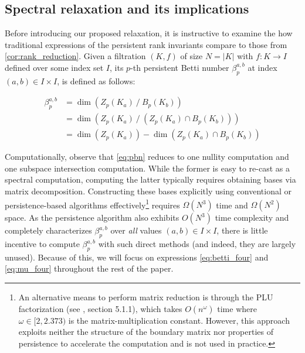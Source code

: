 \documentclass[pdflatex,sn-mathphys-num]{sn-jnl}
\begin{document}
\subsection{Spectral relaxation and its implications}\label{sec:spectral_sec}

Before introducing our proposed relaxation, it is instructive to examine the how traditional expressions of the persistent rank invariants compare to those from \ref{cor:rank_reduction}. Given a filtration \((K,f)\) of size \(N = |K|\) with \(f:K \rightarrow I\) defined over some index set \(I\), its \(p\)-th persistent Betti number \(\beta_{p}^{a,b}\) at index \((a,b) \in I \times I\), is defined as follows:

\[\begin{aligned}
\beta_{p}^{a,b} & = \dim(Z_{p}\left( K_{a} \right)\:/\: B_{p}\left( K_{b} \right)) \\
 & = \dim(Z_{p}\left( K_{a} \right)\:/\:\left( Z_{p}\left( K_{a} \right) \cap B_{p}\left( K_{b} \right) \right)) \\
 & = \dim(Z_{p}\left( K_{a} \right)) - \dim(Z_{p}\left( K_{a} \right) \cap B_{p}\left( K_{b} \right))
\end{aligned}\] \protect{}\label{eq:pbn}{}

Computationally, observe that \ref{eq:pbn} reduces to one nullity computation and one subspace intersection computation. While the former is easy to re-cast as a spectral computation, computing the latter typically requires obtaining bases via matrix decomposition. Constructing these bases explicitly using conventional \cite{bhatia2013matrix} or persistence-based \cite{zomorodian2004computing}\cite{memoli2022persistent} algorithms effectively\footnote{An alternative means to perform matrix reduction is through the PLU factorization (see \cite{dey2022computational}, section 5.1.1), which takes \(O\left( n^{\omega} \right)\) time where \(\omega \in [ 2,2.373)\) is the matrix-multiplication constant. However, this approach exploits neither the structure of the boundary matrix nor properties of persistence to accelerate the computation and is not used in practice.} requires \(\Omega \left( N^{3} \right) \) time and \(\Omega \left( N^{2} \right) \) space. As the persistence algorithm also exhibits \(O \left( N^{3} \right) \) time complexity and completely characterizes \(\beta_{p}^{a,b}\) over \emph{all} values \((a,b) \in I \times I\), there is little incentive to compute \(\beta_{p}^{a,b}\) with such direct methods (and indeed, they are largely unused). Because of this, we will focus on expressions \ref{eq:betti_four} and \ref{eq:mu_four} throughout the rest of the paper.
\end{document}
